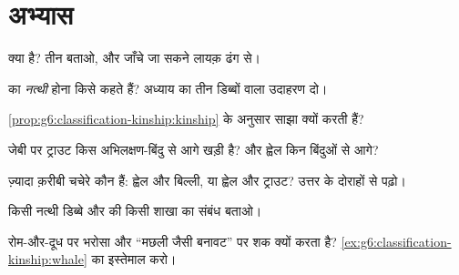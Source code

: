 \section{अभ्यास}

\begin{exercise}[$\star$]\label{exo:g6:classification-kinship:1}
 क्या है? तीन बताओ, और जाँचे जा सकने लायक़ ढंग से।
\end{exercise}

\begin{exercise}[$\star$]\label{exo:g6:classification-kinship:2}
 का \emph{नत्थी} होना किसे कहते हैं? अध्याय का तीन डिब्बों
वाला उदाहरण दो।
\end{exercise}

\begin{exercise}[$\star$]\label{exo:g6:classification-kinship:3}
\cref{prop:g6:classification-kinship:kinship} के अनुसार 
 साझा क्यों करती हैं?
\end{exercise}

\begin{exercise}[$\star$]\label{exo:g6:classification-kinship:4}
जेबी  पर ट्राउट किस अभिलक्षण-बिंदु से आगे खड़ी है? और ह्वेल किन
बिंदुओं से आगे?
\end{exercise}

\begin{exercise}[$\star$]\label{exo:g6:classification-kinship:5}
ज़्यादा क़रीबी चचेरे कौन हैं: ह्वेल और बिल्ली, या ह्वेल और ट्राउट?
उत्तर  के दोराहों से पढ़ो।
\end{exercise}

\begin{exercise}[$\star$]\label{exo:g6:classification-kinship:6}
किसी नत्थी डिब्बे और  की किसी शाखा का संबंध बताओ।
\end{exercise}

\begin{exercise}[$\star\star$]\label{exo:g6:classification-kinship:7}
 रोम-और-दूध पर भरोसा और ``मछली जैसी बनावट'' पर शक क्यों करता
है? \cref{ex:g6:classification-kinship:whale} का इस्तेमाल करो।
\end{exercise}

